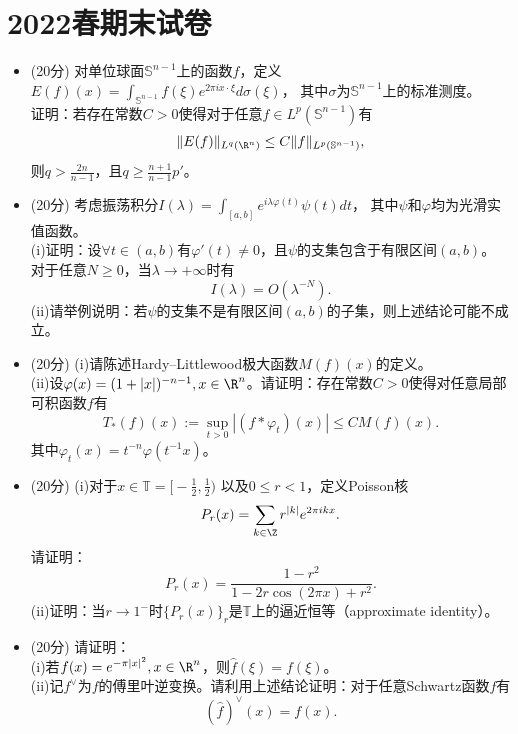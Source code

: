 \section{2022春期末试卷}
\begin{itemize}
\item[1.](20分) 对单位球面$\mathbb{S}^{n-1}$上的函数$f$，定义
$E(f)(x)=\int_{\mathbb{S}^{n-1}}f(\xi)e^{2\pi ix\cdot\xi}d\sigma(\xi)$，
其中$\sigma$为$\mathbb{S}^{n-1}$上的标准测度。\\
证明：若存在常数$C>0$使得对于任意$f\in L^p(\mathbb{S}^{n-1})$有
$$\|E(f)\|_{L^q(\R^n)}\le C\|f\|_{L^p(\mathbb{S}^{n-1})},$$
则$q>\frac{2n}{n-1}$，且$q\ge \frac{n+1}{n-1}p'$。
\item[2.](20分) 考虑振荡积分$I(\lambda)=\int_{[a,b]}e^{i\lambda\varphi(t)}\psi(t)dt$，
其中$\psi$和$\varphi$均为光滑实值函数。\\
(i)证明：设$\forall t\in(a,b)$有$\varphi'(t)\ne0$，且$\psi$的支集包含于有限区间$(a,b)$。
对于任意$N\ge0$，当$\lambda\to+\infty$时有
$$I(\lambda)=O(\lambda^{-N}).$$
(ii)请举例说明：若$\psi$的支集不是有限区间$(a,b)$的子集，则上述结论可能不成立。
\item[3.](20分) (i)请陈述Hardy--Littlewood极大函数$M(f)(x)$的定义。\\
(ii)设$\varphi(x)=(1+|x|)^{-n-1},x\in\R^n$。请证明：存在常数$C>0$使得对任意局部可积函数$f$有
$$T_*(f)(x):=\sup_{t>0}|(f*\varphi_t)(x)|\le CM(f)(x).$$
其中$\varphi_t(x)=t^{-n}\varphi(t^{-1}x)$。
\item[4.](20分) (i)对于$x\in\mathbb{T}=\big[\!\!-\!\!\frac{1}{2},\frac{1}{2}\big)$
以及$0\le r<1$，定义Poisson核
$$P_r(x)=\sum_{k\in\Z}r^{|k|}e^{2\pi ikx}.$$
请证明：
$$P_r(x)=\frac{1-r^2}{1-2r\cos(2\pi x)+r^2}.$$
(ii)证明：当$r\to1^-$时$\{P_r(x)\}_r$是$\mathbb{T}$上的逼近恒等（approximate identity）。
\item[5.](20分) 请证明：\\
(i)若$f(x)=e^{-\pi|x|^2},x\in\R^n$，则$\hat{f}(\xi)=f(\xi)$。\\
(ii)记$f^\vee$为$f$的傅里叶逆变换。请利用上述结论证明：对于任意Schwartz函数$f$有
$$(\hat{f})^\vee(x)=f(x).$$
\end{itemize}